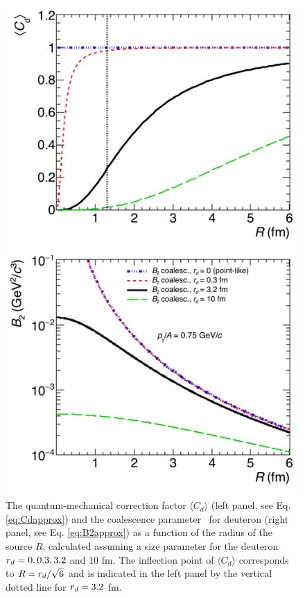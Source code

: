 \begin{figure}[ht]
\begin{center}
\includegraphics[width=1\columnwidth]{../theory_coalescence_Cd_B2_vert.png}
\caption{{The quantum-mechanical correction factor $\langle C_{d} \rangle$ (left panel, see Eq. \ref{eq:Cdapprox}) and the coalescence parameter \btwo~for deuteron (right panel, see Eq. \ref{eq:B2approx}) as a function of the radius of the source $R$, calculated assuming a size parameter for the deuteron $r_{d} = 0, 0.3, 3.2$ and $10$ fm. The inflection point of $\langle C_{d} \rangle$ corresponds to $R = r_{d}/\sqrt{6}$ and is indicated in the left panel by the vertical dotted line for $r_{d} = 3.2$ fm.}}
\label{fig:radiusDependence}
\end{center}
\end{figure}

